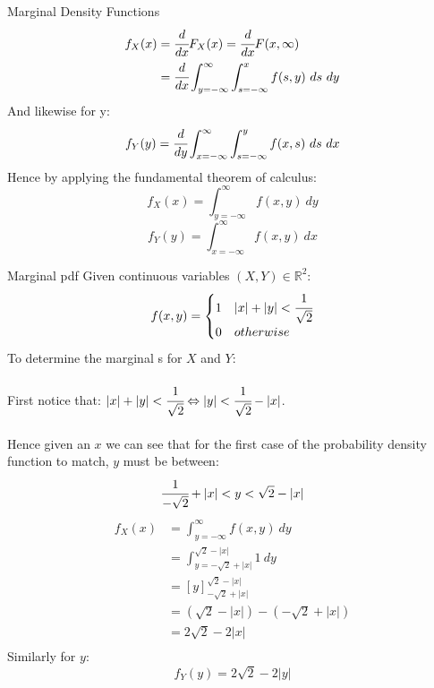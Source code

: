 \begin{definitionbox}{Marginal Density Functions}
	\[\begin{split}
			f_X(x) & = \cfrac{d}{dx} F_X(x) = \cfrac{d}{dx}F(x, \infty) \\
			& = \cfrac{d}{dx} \int_{y=-\infty}^{\infty} \int_{s = -\infty}^x f(s,y) \ ds \ dy \\
		\end{split}\]
	And likewise for y:
	\[f_Y(y) = \cfrac{d}{dy} \int_{x = -\infty}^{\infty} \int_{s = -\infty}^y f(x,s) \ ds \ dx\]
	Hence by applying the fundamental theorem of calculus:
	\[f_X(x) = \int_{y=-\infty}^{\infty} f(x,y) \ dy\]
	\[f_Y(y) = \int_{x=-\infty}^{\infty} f(x,y) \ dx\]
\end{definitionbox}
\begin{examplebox}{Marginal pdf}
	Given continuous variables $(X, Y) \in \mathbb{R}^2$:
	\[f(x,y) = \begin{cases}
			1 & |x| + |y| < \cfrac{1}{\sqrt{2}} \\
			0 & otherwise                       \\
		\end{cases}\]
	To determine the marginal s for $X$ and $Y$:
	\\
	\\ First notice that: $|x| + |y| < \cfrac{1}{\sqrt{2}} \Leftrightarrow |y| < \cfrac{1}{\sqrt{2}} - |x|$.
	\\
	\\ Hence given an $x$ we can see that for the first case of the probability density function to match, $y$ must be between:
	\[\cfrac{1}{- \sqrt{2}} + |x| < y < \sqrt{2} - |x|\]
	\[\begin{split}
			f_X(x) & = \int_{y=-\infty}^{\infty} f(x,y) \ dy \\
			& = \int_{y=- \sqrt{2} + |x|}^{\sqrt{2} - |x|} 1 \ dy \\
			& = \left[ y \right]_{-\sqrt{2} + |x|}^{\sqrt{2} - |x|} \\
			& = \left( \sqrt{2} - |x| \right) - \left( -\sqrt{2} + |x| \right) \\
			& = 2 \sqrt{2} - 2|x|  \\
		\end{split}\]
	Similarly for $y$:
	\[f_Y(y) = 2 \sqrt{2} - 2|y|\]
\end{examplebox}

